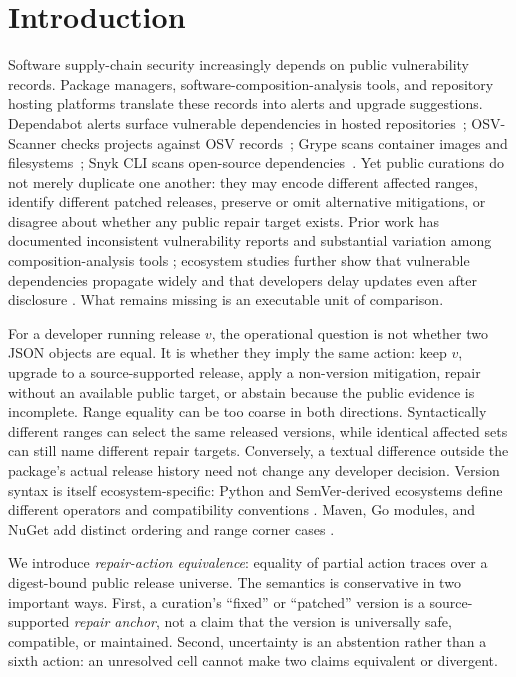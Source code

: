 \documentclass[10pt,conference]{IEEEtran}
\begin{document}
\section{Introduction}
Software supply-chain security increasingly depends on public vulnerability records. Package managers, software-composition-analysis tools, and repository hosting platforms translate these records into alerts and upgrade suggestions. Dependabot alerts surface vulnerable dependencies in hosted repositories~\cite{githubDependabotAlerts}; OSV-Scanner checks projects against OSV records~\cite{osvScannerDocs}; Grype scans container images and filesystems~\cite{grypeDocs}; Snyk CLI scans open-source dependencies~\cite{snykCliOpenSource}. Yet public curations do not merely duplicate one another: they may encode different affected ranges, identify different patched releases, preserve or omit alternative mitigations, or disagree about whether any public repair target exists. Prior work has documented inconsistent vulnerability reports and substantial variation among composition-analysis tools \cite{dong2019inconsistencies,imtiaz2021sca}; ecosystem studies further show that vulnerable dependencies propagate widely and that developers delay updates even after disclosure \cite{zimmermann2019npm,kula2018updates,zerouali2022impact,liu2022dvgraph}. What remains missing is an executable unit of comparison.

For a developer running release $v$, the operational question is not whether two JSON objects are equal. It is whether they imply the same action: keep $v$, upgrade to a source-supported release, apply a non-version mitigation, repair without an available public target, or abstain because the public evidence is incomplete. Range equality can be too coarse in both directions. Syntactically different ranges can select the same released versions, while identical affected sets can still name different repair targets. Conversely, a textual difference outside the package's actual release history need not change any developer decision. Version syntax is itself ecosystem-specific: Python and SemVer-derived ecosystems define different operators and compatibility conventions \cite{pep440,semver,cargoSemver}. Maven, Go modules, and NuGet add distinct ordering and range corner cases \cite{mavenVersions,goModules,nugetVersions}.

We introduce \emph{repair-action equivalence}: equality of partial action traces over a digest-bound public release universe. The semantics is conservative in two important ways. First, a curation's ``fixed'' or ``patched'' version is a source-supported \emph{repair anchor}, not a claim that the version is universally safe, compatible, or maintained. Second, uncertainty is an abstention rather than a sixth action: an unresolved cell cannot make two claims equivalent or divergent.
\end{document}
